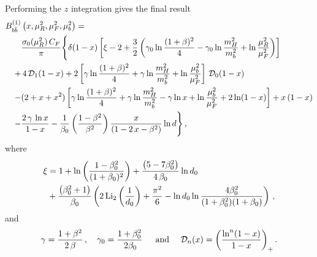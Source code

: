 Performing the $z$ integration gives the final result
\begin{equation}
  \label{eq:b1-massive}
  \begin{split}
    B_{b\bar{b}}^{(1)}&\left(x,\mu_R^2,\mu_F^2 ,\mu_b^2\right) = \\
    &\frac{\sigma_0(\mu_R^2)\,C_F}{\pi}
    \Biggl\{
    \delta(1-x)
    \left[
      \xi -2 + \frac{3}{2}\left(\gamma_0\ln
        \frac{(1+\beta)^2}{4} -\gamma_0\ln \frac{m_H^2}{m_b^2}+
        \ln\frac{\mu_R^2}{\mu_F^2} \right)
    \right]\\
  +&\,4\,{\cal D}_1(1-x) 
  +  2
  \left[
    \gamma\ln\frac{(1+\beta)^2}{4}+\gamma\ln\frac{m_H^2}{m_b^2}+
    \ln{\frac{\mu_b^2}{\mu_F^2}}
  \right]\,
  {\cal D}_0(1-x)\\
  -& (2 + x + x^2)\left[\gamma\ln\frac{(1+\beta)^2}{4}
    +\gamma\ln\frac{m_H^2}{m_b^2}-\gamma\ln x+
    \ln{\frac{\mu_b^2}{\mu_F^2}}
    +2\ln(1-x)\right]+ x\,(1-x) \\
  -&  \frac{2\,\gamma\,\ln x}{1-x} -
    \frac{1}{\beta_0}\left(\frac{ 1-\beta^2}{\beta^2}\right)
    \frac{x}{\left( 1 - 2\,x - \beta^2\right)}\ln d \Biggr\}\,,
  \end{split} 
\end{equation}
where
\begin{align}
  \xi &= 1+\ln\left(\frac{1-\beta_0^2}{(1+\beta_0)^2}\right)+
  \frac{\left(5-7\beta_0^2\right)}{4\,\beta_0}\ln d_0 \nonumber \\
  &+\frac{\left(\beta_0^2+1\right)}{\beta_0} \left( 2\,{\rm
      Li}_2\left(\frac{1}{d_0}\right)+\frac{\pi ^2}{6} -\ln d_0
    \ln\frac{4\beta_0^2} {(1+\beta_0^2)(1+\beta_0)}\right)\,,
\end{align}
and
\begin{equation}
  \gamma = \frac{1+\beta^2}{2\,\beta}\,,\quad \gamma_0 =
  \frac{1+\beta_0^2}{\,2\beta_0}\, \quad \text{ and }
  \quad {\cal D}_n(x) ={\left( \frac{\ln^n(1-x)}{1-x} \right) }_{+}\,.
\end{equation}


